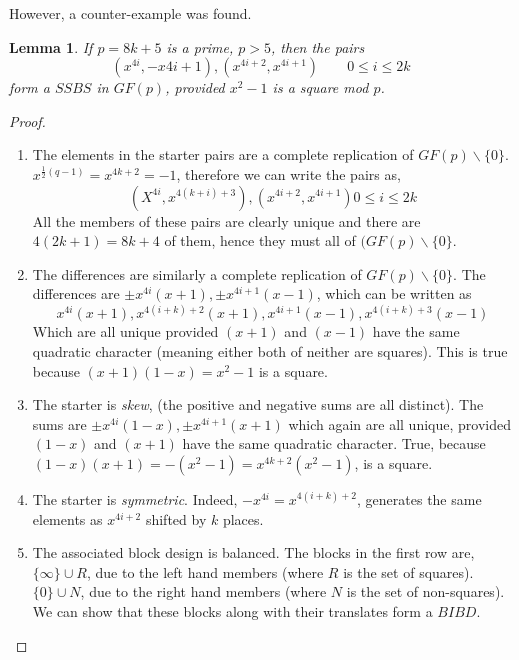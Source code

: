 \documentclass[
  11pt,
  a4paper]{book}\usepackage[]{graphicx}\usepackage[]{xcolor}
\newtheorem{lemma}[theorem]{Lemma}
\newcounter{example}
\begin{document}
However, a counter-example was found.
\begin{lemma}
If $p = 8k + 5$ is a prime, $p > 5$, then the pairs
\begin{equation}
(x^{4i}, -x{4i + 1}), (x^{4i + 2}, x^{4i + 1}) \qquad 0 \leq i \leq 2k
\end{equation}
form a $SSBS$ in $GF(p)$, provided $x^2 - 1$ is a square mod
$p$.
\end{lemma}
\begin{proof}
\begin{enumerate}
\item{The elements in the starter pairs are a complete
    replication of $GF(p) \backslash \{0\}$.
    $x^{\frac{1}{2} (q - 1)} = x^{4k + 2} = -1$, therefore we
    can write the pairs as,
    $$(X^{4i}, x^{4(k + i) + 3}), (x^{4i + 2}, x^{4i + 1}) 0 \leq i \leq 2k$$
    All the members of these pairs are clearly unique and
    there are $4(2k + 1) = 8k + 4$ of them, hence they must all of
    $(GF(p) \backslash \{0\}$.}
\item{The differences are similarly a complete replication of
    $GF(p) \backslash \{0\}$. The differences are
    $\pm x^{4i}(x + 1), \pm x^{4i + 1}(x - 1)$, which can be written
    as
    $$x^{4i}(x + 1), x^{4(i + k) + 2}(x + 1), x^{4i + 1}(x - 1), x^{4(i + k) + 3}(x-1)$$
    Which are all unique provided $(x + 1)$ and $(x - 1)$ have
    the same quadratic character (meaning either both of
    neither are squares).  This is true because
    $(x + 1)(1 - x) = x^2 - 1$ is a square.}
\item{The starter is \emph{skew}, (the positive and negative sums
    are all distinct).  The sums are
    $\pm x^{4i}(1 - x), \pm x^{4i + 1}(x + 1)$
    which again are all unique, provided
    $(1 - x)$ and $(x + 1)$ have the same quadratic
    character.  True, because
    $(1 - x)(x  +1) = -(x^2 - 1) = x^{4k + 2}(x^2  -1)$, is a square.}
\item{The starter is \emph{symmetric}.
    Indeed, $-x^{4i} = x^{4(i + k) + 2}$, generates the
    same elements as $x^{4i + 2}$ shifted by $k$ places.}
\item{The associated block design is balanced.  The blocks in
    the first row are, $\{\infty\} \cup R$, due to the left
    hand members (where $R$ is the set of squares).
    $\{0\} \cup N$, due to the right hand members (where
    $N$ is the set of non-squares).
    We can show that these blocks along with their translates
    form a $BIBD$.
    
}
\end{enumerate}
\end{proof}
\end{document}
